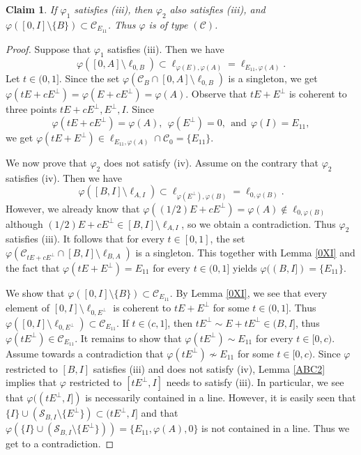 \documentclass[10pt]{amsart}
\newtheorem{claim}[theorem]{Claim}
\theoremstyle{definition}
\theoremstyle{remark}
\numberwithin{subsection}{section}
\numberwithin{equation}{section}
\newcommand\cC{{\mathcal{C}}}
\begin{document}
\begin{claim}
If $\varphi_1$ satisfies (iii), then $\varphi_2$ also satisfies (iii), and 
$\varphi([0, I]\setminus\{B\})\subset \cC_{E_{11}}$.
Thus $\varphi$ is of type $(\mathcal{C})$.
\end{claim}
\begin{proof}
Suppose that $\varphi_1$ satisfies (iii).
Then we have 
\[
\varphi([0,A]\setminus\ell_{0,B})\subset \ell_{\varphi(E), \varphi(A)}=\ell_{E_{11}, \varphi(A)}.
\]
Let $t\in (0,1]$.
Since the set $\varphi(\mathcal{C}_B\cap [0, A]\setminus \ell_{0, B})$ is a singleton, 
we get $\varphi(tE+cE^\perp)=\varphi(E+cE^\perp)=\varphi(A)$.
Observe that $tE+E^\perp$ is coherent to three points $tE+cE^\perp, E^\perp, I$. 
Since 
\[
\varphi(tE+cE^\perp) =\varphi(A), \ \ \varphi(E^\perp)=0, \ \ \text{and} \ \ \varphi(I)=E_{11}, 
\]
we get $\varphi(tE+E^\perp)\in\ell_{E_{11}, \varphi (A)}\cap\cC_0=\{E_{11}\}$.

We now prove that $\varphi_2$ does not satisfy (iv). 
Assume on the contrary that $\varphi_2$ satisfies (iv). 
Then we have 
\[
\varphi([B,I]\setminus \ell_{A, I}) \subset \ell_{\varphi(E^\perp), \varphi(B)} =\ell_{0, \varphi(B)}.
\]
However, we already know that $\varphi((1/2)E+cE^\perp)=\varphi(A)\notin \ell_{0, \varphi(B)}$ although $(1/2)E+cE^\perp\in [B,I]\setminus \ell_{A, I}$, so we obtain a contradiction. 
Thus $\varphi_2$ satisfies (iii). 
It follows that for every $t\in [0,1]$, the set $\varphi (\mathcal{C}_{tE+cE^\perp} \cap [B,I] \setminus \ell_{B,A})$ is a singleton.
This together with Lemma \ref{0XI} and the fact that $\varphi(tE+E^\perp)=E_{11}$ for every $t\in (0,1]$ yields $\varphi((B, I])=\{E_{11}\}$. 

We show that $\varphi([0, I]\setminus\{B\})\subset \cC_{E_{11}}$. 
By Lemma \ref{0XI}, we see that every element of $[0,I]\setminus\ell_{0,E^\perp}$ is coherent to $tE+E^\perp$ for some $t\in (0,1]$. Thus $\varphi([0,I]\setminus\ell_{0,E^\perp}) \subset \cC_{E_{11}}$.
If $t\in (c,1]$, then $tE^\perp \sim E+tE^\perp \in (B, I]$, thus $\varphi(tE^\perp)\in \cC_{E_{11}}$. 
It remains to show that $\varphi(tE^\perp)\sim E_{11}$ for every $t\in [0,c)$.
Assume towards a contradiction that $\varphi(tE^\perp)\not\sim E_{11}$ for some $t\in [0,c)$. 
Since $\varphi$ restricted to $[B,I]$ satisfies (iii) and does not satisfy (iv), Lemma \ref{ABC2} implies that $\varphi$ restricted to $[tE^\perp, I]$ needs to satisfy (iii). 
In particular, we see that $\varphi((tE^\perp, I])$ is necessarily contained in a line. 
However, it is easily seen that $\{I\}\cup({\mathcal{S}}_{B, I}\setminus\{E^\perp\}) \subset (tE^\perp, I]$ and
that $\varphi(\{I\}\cup({\mathcal{S}}_{B, I}\setminus\{E^\perp\}))=\{E_{11},\varphi(A), 0\}$ is not contained in a line. 
Thus we get to a contradiction.
\end{proof}
\end{document}
